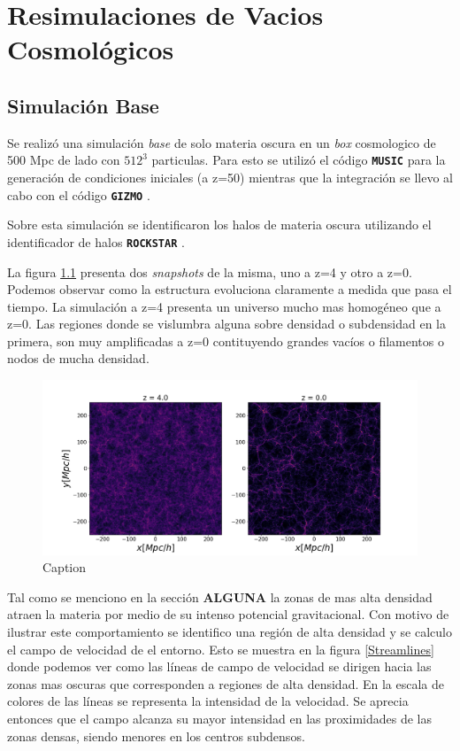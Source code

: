 \chapter{Resimulaciones de Vacios Cosmol\'ogicos} %

\label{Voids} %



\section{Simulaci\'on Base}

Se realiz\'o una simulaci\'on \textit{base} de solo materia oscura en un \textit{box} cosmologico de 500 Mpc de lado con $512^{3}$ particulas. Para esto se utiliz\'o el c\'odigo \texttt{\textbf{MUSIC}} \citep{MUSIC} para la generaci\'on de condiciones iniciales (a z=50) mientras que la integraci\'on se llevo al cabo con el c\'odigo \texttt{\textbf{GIZMO}} \citep{GIZMO2015}. 

Sobre esta simulaci\'on se identificaron los halos de materia oscura utilizando el identificador de halos \texttt{\textbf{ROCKSTAR}} \citep{Rockstar}. 

La figura \ref{Base2snap} presenta dos \textit{snapshots} de la misma, uno a z=4 y otro a z=0. Podemos observar como la estructura evoluciona claramente a medida que pasa el tiempo. La simulaci\'on a z=4 presenta un universo mucho mas homog\'eneo que a z=0. Las regiones donde se vislumbra alguna sobre densidad o subdensidad en la primera, son muy amplificadas a z=0 contituyendo grandes vac\'ios o filamentos o nodos de mucha densidad. 


\begin{figure}
    \centering
    \includegraphics[width=15cm]{Figures/Base_2snap.png}
    \caption{Caption}
    \label{Base2snap}
\end{figure}{}

Tal como se menciono en la secci\'on \textbf{ALGUNA} la zonas de mas alta densidad atraen la materia por medio de su intenso potencial gravitacional. Con motivo de ilustrar este comportamiento se identifico una regi\'on de alta densidad y se calculo el campo de velocidad de el entorno. Esto se muestra en la figura \ref{Streamlines} donde podemos ver como las l\'ineas de campo de velocidad se dirigen hacia las zonas mas oscuras que corresponden a regiones de alta densidad. En la escala de colores de las l\'ineas se representa la intensidad de la velocidad. Se aprecia entonces que el campo alcanza su mayor intensidad en las proximidades de las zonas densas, siendo menores en los centros subdensos. 

